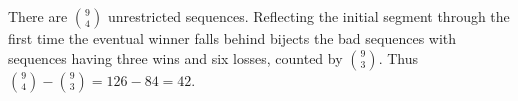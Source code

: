 There are $\binom94$ unrestricted sequences. Reflecting the initial segment through the first time the eventual winner falls behind bijects the bad sequences with sequences having three wins and six losses, counted by $\binom93$. Thus $\binom94-\binom93=126-84=\boxed{42}$.
